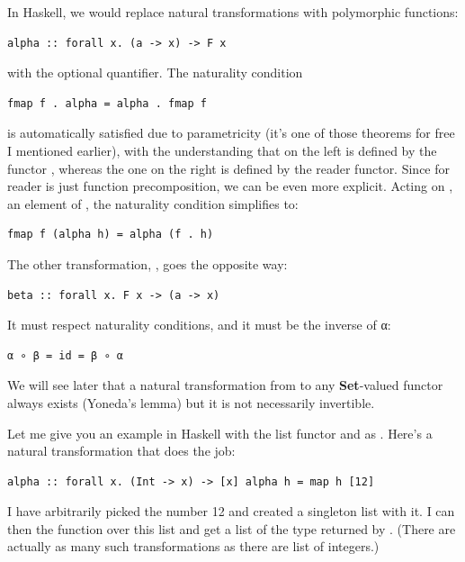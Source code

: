 In Haskell, we would replace natural transformations with polymorphic
functions:

\begin{verbatim}
alpha :: forall x. (a -> x) -> F x
\end{verbatim}

with the optional  quantifier. The naturality condition

\begin{verbatim}
fmap f . alpha = alpha . fmap f
\end{verbatim}

is automatically satisfied due to parametricity (it's one of those
theorems for free I mentioned earlier), with the understanding that
 on the left is defined by the functor , whereas
the one on the right is defined by the reader functor. Since
 for reader is just function precomposition, we can be even
more explicit. Acting on , an element of ,
the naturality condition simplifies to:

\begin{verbatim}
fmap f (alpha h) = alpha (f . h)
\end{verbatim}

The other transformation, , goes the opposite way:

\begin{verbatim}
beta :: forall x. F x -> (a -> x)
\end{verbatim}

It must respect naturality conditions, and it must be the inverse of α:

\begin{verbatim}
α ∘ β = id = β ∘ α
\end{verbatim}

We will see later that a natural transformation from 
to any \textbf{Set}-valued functor always exists (Yoneda's lemma) but it
is not necessarily invertible.

Let me give you an example in Haskell with the list functor and
 as . Here's a natural transformation that does
the job:

\begin{verbatim}
alpha :: forall x. (Int -> x) -> [x] alpha h = map h [12]
\end{verbatim}

I have arbitrarily picked the number 12 and created a singleton list
with it. I can then  the function  over this list
and get a list of the type returned by . (There are actually
as many such transformations as there are list of integers.)

